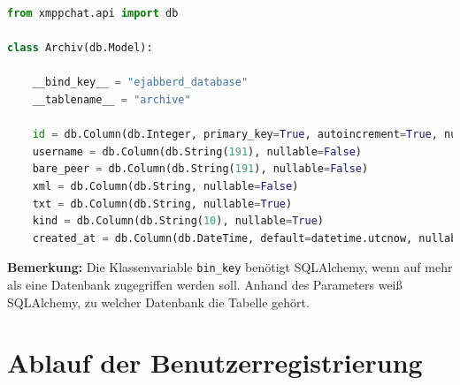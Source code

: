 \documentclass[a4paper,titlepage,halfparskip,12pt]{scrreprt}
\begin{document}
\begin{lstlisting}[language=python, caption={SQLAlchemy Schema für die Tabelle der Chatverläufe von ejabberd}, label={lst:flaskClassArchiv}]
from xmppchat.api import db

class Archiv(db.Model):

    __bind_key__ = "ejabberd_database"
    __tablename__ = "archive"

    id = db.Column(db.Integer, primary_key=True, autoincrement=True, nullable=False)
    username = db.Column(db.String(191), nullable=False)
    bare_peer = db.Column(db.String(191), nullable=False)
    xml = db.Column(db.String, nullable=False)
    txt = db.Column(db.String, nullable=True)
    kind = db.Column(db.String(10), nullable=True)
    created_at = db.Column(db.DateTime, default=datetime.utcnow, nullable=False)

\end{lstlisting}

\textbf{Bemerkung:} Die Klassenvariable \texttt{bin\_key} benötigt SQLAlchemy, wenn auf mehr als eine Datenbank zugegriffen werden soll. Anhand des Parameters weiß SQLAlchemy, zu welcher Datenbank die Tabelle gehört.

\pagebreak

\section{Ablauf der Benutzerregistrierung}
\end{document}
